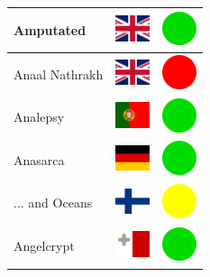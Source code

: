 \documentclass[12pt, a4paper, twoside]{report}
\begin{document}
\begin{center}
\begin{longtable}{|p{5cm}|p{2cm}|p{2cm}|}
 Amputated                                                  & \includegraphics[width=1cm]{../img/flags/gb} &   \includegraphics[width=1cm]{../likes/y} \\ \hline
 Anaal Nathrakh                                             & \includegraphics[width=1cm]{../img/flags/gb} &   \includegraphics[width=1cm]{../likes/n} \\ \hline
 Analepsy                                                   & \includegraphics[width=1cm]{../img/flags/pt} &   \includegraphics[width=1cm]{../likes/y} \\ \hline
 Anasarca                                                   & \includegraphics[width=1cm]{../img/flags/de} &   \includegraphics[width=1cm]{../likes/y} \\ \hline
 ... and Oceans                                             & \includegraphics[width=1cm]{../img/flags/fi} &   \includegraphics[width=1cm]{../likes/m} \\ \hline
 Angelcrypt                                                 & \includegraphics[width=1cm]{../img/flags/mt} &   \includegraphics[width=1cm]{../likes/y} \\ \hline

\end{longtable}
\end{center}
\end{document}
